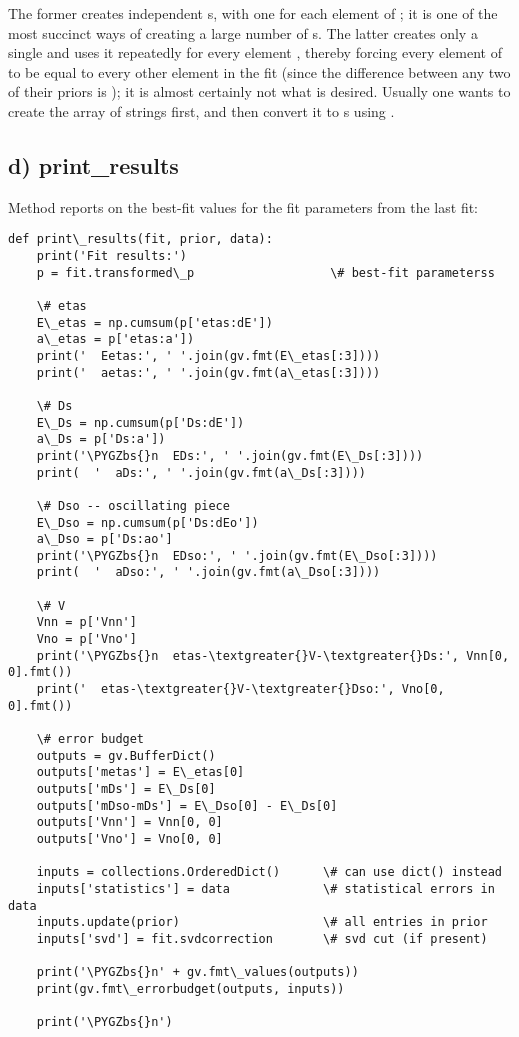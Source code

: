 \documentclass[letterpaper,10pt,english]{sphinxmanual}
\def\PYGZbs{\char`\\}
\begin{document}
The former creates  independent s, with one for each element
of ; it is one of the most succinct ways of creating a large number of
s. The latter creates only a single  and uses it repeatedly for
every element , thereby forcing every element of   to be equal
to every other element in the fit (since the difference between any two of
their priors is ); it is almost certainly not what is desired.
Usually one wants to create the array of strings first, and then convert it to
s using .


\subsection{d) print\_results}
\label{corrfitter:id6}
Method  reports on the best-fit values
for the fit parameters from the last fit:

\begin{Verbatim}[commandchars=\\\{\}]
def print\_results(fit, prior, data):
    print('Fit results:')
    p = fit.transformed\_p                   \# best-fit parameterss

    \# etas
    E\_etas = np.cumsum(p['etas:dE'])
    a\_etas = p['etas:a'])
    print('  Eetas:', ' '.join(gv.fmt(E\_etas[:3])))
    print('  aetas:', ' '.join(gv.fmt(a\_etas[:3])))

    \# Ds
    E\_Ds = np.cumsum(p['Ds:dE'])
    a\_Ds = p['Ds:a'])
    print('\PYGZbs{}n  EDs:', ' '.join(gv.fmt(E\_Ds[:3])))
    print(  '  aDs:', ' '.join(gv.fmt(a\_Ds[:3])))

    \# Dso -- oscillating piece
    E\_Dso = np.cumsum(p['Ds:dEo'])
    a\_Dso = p['Ds:ao']
    print('\PYGZbs{}n  EDso:', ' '.join(gv.fmt(E\_Dso[:3])))
    print(  '  aDso:', ' '.join(gv.fmt(a\_Dso[:3])))

    \# V
    Vnn = p['Vnn']
    Vno = p['Vno']
    print('\PYGZbs{}n  etas-\textgreater{}V-\textgreater{}Ds:', Vnn[0, 0].fmt())
    print('  etas-\textgreater{}V-\textgreater{}Dso:', Vno[0, 0].fmt())

    \# error budget
    outputs = gv.BufferDict()
    outputs['metas'] = E\_etas[0]
    outputs['mDs'] = E\_Ds[0]
    outputs['mDso-mDs'] = E\_Dso[0] - E\_Ds[0]
    outputs['Vnn'] = Vnn[0, 0]
    outputs['Vno'] = Vno[0, 0]

    inputs = collections.OrderedDict()      \# can use dict() instead
    inputs['statistics'] = data             \# statistical errors in data
    inputs.update(prior)                    \# all entries in prior
    inputs['svd'] = fit.svdcorrection       \# svd cut (if present)

    print('\PYGZbs{}n' + gv.fmt\_values(outputs))
    print(gv.fmt\_errorbudget(outputs, inputs))

    print('\PYGZbs{}n')
\end{Verbatim}
\end{document}
